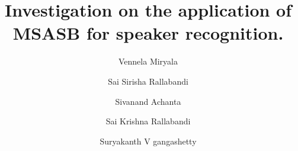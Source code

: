 \documentclass{acm_proc_article-sp}
\begin{document}
\title{Investigation on the application of MSASB for speaker recognition.
}

%
%
%
%


%




%

\author{Vennela Miryala}
\author{Sai Sirisha Rallabandi}
\author{Sivanand Achanta}
\author{Sai Krishna Rallabandi}
\author{Suryakanth V gangashetty}
\end{document}
